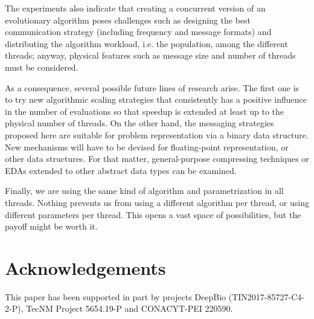 \documentclass[runningheads]{llncs}\usepackage[]{graphicx}\usepackage[]{color}
\begin{document}

The experiments also indicate that creating a concurrent version of an
evolutionary algorithm poses challenges such as designing the best
communication strategy (including frequency and message formats) and
distributing the algorithm workload, i.e. the population,
among the different threads; anyway, physical features such as
message size and number of threads must be considered.

As a consequence, several possible future lines of research arise. 
The first one is to try new algorithmic scaling strategies that
consistently has a positive influence in the number of evaluations so
that speedup is extended at least up to the physical number of
threads. On the other hand, the messaging strategies proposed 
here are suitable for problem representation
via a binary data structure. New mechanisms will
have to be devised for floating-point representation, or other data structures. 
For that matter, general-purpose compressing techniques or EDAs extended to
other abstract data types can be examined. %

Finally, we are using the same kind of algorithm and parametrization in all
threads. Nothing prevents us from using a different algorithm per
thread, or using different parameters per thread. This opens a vast
space of possibilities, but the payoff might be worth it.

\section{Acknowledgements}
This paper has been supported in part by
projects DeepBio (TIN2017-85727-C4-2-P), TecNM Project 5654.19-P and CONACYT-PEI 220590. 


\tiny
 
\end{document}
